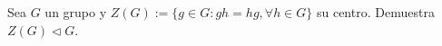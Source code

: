\question 
Sea $G$ un grupo y $Z(G):=\{g\in G: gh=hg, \forall h \in G\}$ su centro. 
Demuestra $Z(G) \triangleleft G$.
